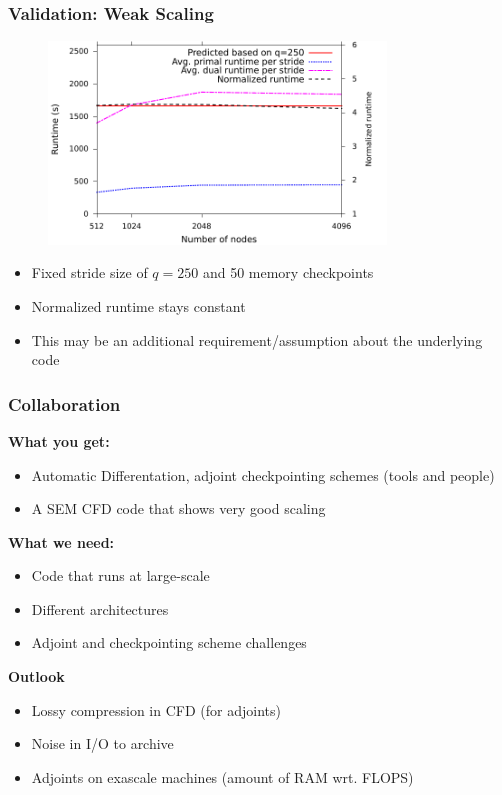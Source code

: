 \begin{frame}
  \frametitle{Validation: Weak Scaling}
  \begin{figure}
    \centering
    \includegraphics[width=0.8\textwidth]{./figures/strong}
    \label{fig:revolve_strong}
  \end{figure}
  \begin{itemize}
    \item Fixed stride size of $q=250$ and 50 memory checkpoints
    \item Normalized runtime stays constant
    \item This may be an additional requirement/assumption about the underlying
      code
  \end{itemize}
\end{frame}

\begin{frame}
  \frametitle{Collaboration}
  {\bf What you get:}
  \begin{itemize}
    \item Automatic Differentation, adjoint checkpointing schemes (tools and people)
    \item A SEM CFD code that shows very good scaling
  \end{itemize}
  {\bf What we need:}
  \begin{itemize}
    \item Code that runs at large-scale
    \item Different architectures
    \item Adjoint and checkpointing scheme challenges
  \end{itemize}
  {\bf Outlook}
  \begin{itemize}
    \item Lossy compression in CFD (for adjoints)
    \item Noise in I/O to archive
    \item Adjoints on exascale machines (amount of RAM wrt. FLOPS)
  \end{itemize}
\end{frame}

